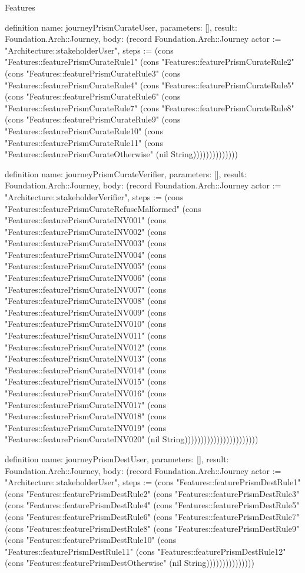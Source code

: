 \begin{lexlean}{Features}
\begin{semanticmodule}
definition{
  name: journeyPrismCurateUser,
  parameters: [],
  result: Foundation.Arch::Journey,
  body: (record Foundation.Arch::Journey {actor := "Architecture::stakeholderUser", steps := (cons "Features::featurePrismCurateRule1" (cons "Features::featurePrismCurateRule2" (cons "Features::featurePrismCurateRule3" (cons "Features::featurePrismCurateRule4" (cons "Features::featurePrismCurateRule5" (cons "Features::featurePrismCurateRule6" (cons "Features::featurePrismCurateRule7" (cons "Features::featurePrismCurateRule8" (cons "Features::featurePrismCurateRule9" (cons "Features::featurePrismCurateRule10" (cons "Features::featurePrismCurateRule11" (cons "Features::featurePrismCurateOtherwise" (nil String)))))))))))))})
}

definition{
  name: journeyPrismCurateVerifier,
  parameters: [],
  result: Foundation.Arch::Journey,
  body: (record Foundation.Arch::Journey {actor := "Architecture::stakeholderVerifier", steps := (cons "Features::featurePrismCurateRefuseMalformed" (cons "Features::featurePrismCurateINV001" (cons "Features::featurePrismCurateINV002" (cons "Features::featurePrismCurateINV003" (cons "Features::featurePrismCurateINV004" (cons "Features::featurePrismCurateINV005" (cons "Features::featurePrismCurateINV006" (cons "Features::featurePrismCurateINV007" (cons "Features::featurePrismCurateINV008" (cons "Features::featurePrismCurateINV009" (cons "Features::featurePrismCurateINV010" (cons "Features::featurePrismCurateINV011" (cons "Features::featurePrismCurateINV012" (cons "Features::featurePrismCurateINV013" (cons "Features::featurePrismCurateINV014" (cons "Features::featurePrismCurateINV015" (cons "Features::featurePrismCurateINV016" (cons "Features::featurePrismCurateINV017" (cons "Features::featurePrismCurateINV018" (cons "Features::featurePrismCurateINV019" (cons "Features::featurePrismCurateINV020" (nil String))))))))))))))))))))))})
}

definition{
  name: journeyPrismDestUser,
  parameters: [],
  result: Foundation.Arch::Journey,
  body: (record Foundation.Arch::Journey {actor := "Architecture::stakeholderUser", steps := (cons "Features::featurePrismDestRule1" (cons "Features::featurePrismDestRule2" (cons "Features::featurePrismDestRule3" (cons "Features::featurePrismDestRule4" (cons "Features::featurePrismDestRule5" (cons "Features::featurePrismDestRule6" (cons "Features::featurePrismDestRule7" (cons "Features::featurePrismDestRule8" (cons "Features::featurePrismDestRule9" (cons "Features::featurePrismDestRule10" (cons "Features::featurePrismDestRule11" (cons "Features::featurePrismDestRule12" (cons "Features::featurePrismDestOtherwise" (nil String))))))))))))))})
}


\end{semanticmodule}
\end{lexlean}
